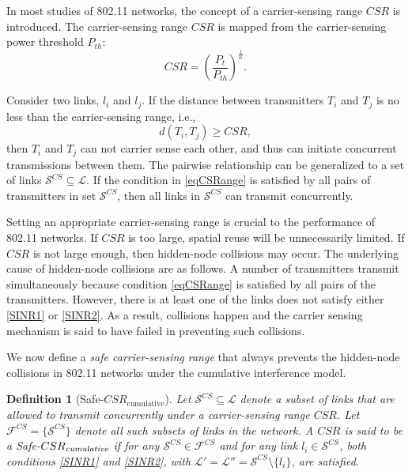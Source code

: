 \documentclass[conference]{IEEEtran}
\newtheorem{definition}{Definition}
\begin{document}
In most studies of 802.11 networks, the concept of a carrier-sensing
range $CSR$ is introduced. The carrier-sensing range $CSR$ is mapped
from the carrier-sensing power threshold $P_{th}$:
\begin{equation}
CSR=\left(\frac{P_t}{P_{th}}\right)^{\frac{1}{\alpha}}.\nonumber
\label{eqTth}
\end{equation}

Consider two links, $l_i$ and $l_j$. If the distance between
transmitters $T_i$ and $T_j$ is no less than the carrier-sensing
range, i.e.,
\begin{equation}
d(T_i,T_j)\geq CSR, \label{eqCSRange}
\end{equation}
then $T_i$ and $T_j$ can not carrier sense each other, and thus can
initiate concurrent transmissions between them. The pairwise
relationship can be generalized to a set of links
$\mathcal{S}^{CS}\subseteq \mathcal{L}$. If the condition in
\eqref{eqCSRange} is satisf\/ied by all pairs of transmitters in set
$\mathcal{S}^{CS}$, then all links in $\mathcal{S}^{CS}$ can
transmit concurrently.

Setting an appropriate carrier-sensing range is crucial to the
performance of 802.11 networks. If $CSR$ is too large, spatial reuse
will be unnecessarily limited. If $CSR$ is not large enough, then
hidden-node collisions may occur. The underlying cause of
hidden-node collisions are as follows. A number of transmitters
transmit simultaneously because condition \eqref{eqCSRange} is
satisf\/ied by all pairs of the transmitters. However, there is at
least one of the links does not satisfy either \eqref{SINR1} or
\eqref{SINR2}. As a result, collisions happen and the carrier
sensing mechanism is said to have failed in preventing such
collisions.

We now def\/ine a \emph{safe carrier-sensing range} that always
prevents the hidden-node collisions in 802.11 networks under the
cumulative interference model.
\begin{definition}[Safe-$CSR_{\text{cumulative}}$]
Let $\mathcal{S}^{ CS}\subseteq \mathcal{L}$ denote a subset of
links that are allowed to transmit concurrently under a
carrier-sensing range $CSR$. Let
$\mathcal{F}^{CS}=\{\mathcal{S}^{CS}\}$ denote all such subsets of
links in the network. A $CSR$ is said to be a
\emph{Safe-}$CSR_{\text{\emph{cumulative}}}$ if for any
$\mathcal{S}^{CS}\in \mathcal{F}^{CS}$ and for any link
$l_i\in\mathcal{S}^{CS}$, both conditions \eqref{SINR1} and
\eqref{SINR2}, with
$\mathcal{L}'=\mathcal{L}''=\mathcal{S}^{CS}\setminus \{l_i\}$, are
satisf\/ied.
\end{definition}
\end{document}

